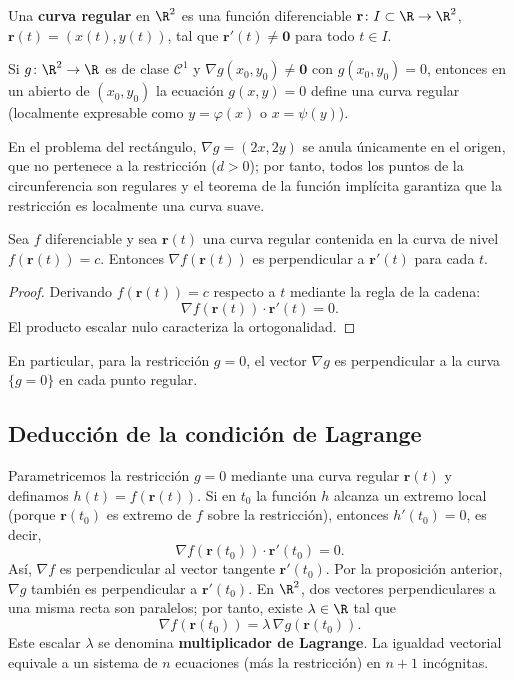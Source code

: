\begin{definition}
Una \textbf{curva regular} en $\R^2$ es una función diferenciable $\mathbf{r}\colon I\subset\R\to\R^2$, $\mathbf{r}(t)=(x(t),y(t))$, tal que $\mathbf{r}'(t)\neq\mathbf{0}$ para todo $t\in I$.
\end{definition}

\begin{theorem}
Si $g\colon\R^2\to\R$ es de clase $\mathcal C^1$ y $\nabla g(x_0,y_0)\neq\mathbf{0}$ con $g(x_0,y_0)=0$, entonces en un abierto de $(x_0,y_0)$ la ecuación $g(x,y)=0$ define una curva regular (localmente expresable como $y=\varphi(x)$ o $x=\psi(y)$).
\end{theorem}

En el problema del rectángulo, $\nabla g=(2x,2y)$ se anula únicamente en el origen, que no pertenece a la restricción ($d>0$); por tanto, todos los puntos de la circunferencia son regulares y el teorema de la función implícita garantiza que la restricción es localmente una curva suave.

\begin{prop}
Sea $f$ diferenciable y sea $\mathbf{r}(t)$ una curva regular contenida en la curva de nivel $f(\mathbf{r}(t))=c$. Entonces $\nabla f(\mathbf{r}(t))$ es perpendicular a $\mathbf{r}'(t)$ para cada $t$.
\end{prop}

\begin{proof}
Derivando $f(\mathbf{r}(t))=c$ respecto a $t$ mediante la regla de la cadena:
\[
\nabla f(\mathbf{r}(t))\cdot \mathbf{r}'(t)=0.
\]
El producto escalar nulo caracteriza la ortogonalidad.
\end{proof}

En particular, para la restricción $g=0$, el vector $\nabla g$ es perpendicular a la curva $\{g=0\}$ en cada punto regular.

\subsection{Deducción de la condición de Lagrange}

Parametricemos la restricción $g=0$ mediante una curva regular $\mathbf{r}(t)$ y definamos $h(t)=f(\mathbf{r}(t))$. Si en $t_0$ la función $h$ alcanza un extremo local (porque $\mathbf{r}(t_0)$ es extremo de $f$ sobre la restricción), entonces $h'(t_0)=0$, es decir,
\[
\nabla f(\mathbf{r}(t_0))\cdot \mathbf{r}'(t_0)=0.
\]
Así, $\nabla f$ es perpendicular al vector tangente $\mathbf{r}'(t_0)$. Por la proposición anterior, $\nabla g$ también es perpendicular a $\mathbf{r}'(t_0)$. En $\R^2$, dos vectores perpendiculares a una misma recta son paralelos; por tanto, existe $\lambda\in\R$ tal que
\[
\nabla f(\mathbf{r}(t_0)) = \lambda\,\nabla g(\mathbf{r}(t_0)).
\]
Este escalar $\lambda$ se denomina \textbf{multiplicador de Lagrange}. La igualdad vectorial equivale a un sistema de $n$ ecuaciones (más la restricción) en $n+1$ incógnitas.

